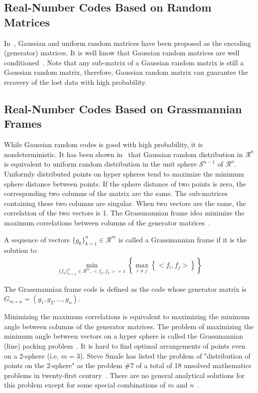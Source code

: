 \documentclass{sig-alternate}
\begin{document}
\subsection{Real-Number Codes Based on Random Matrices}

In~\cite{zchen:random_codes_utk, zchen:random_codes, zchen:random_condition},  
Gaussian and uniform random matrices have been proposed as the encoding (generator) matrices.
It is well know that Gaussian random matrices are well conditioned~\cite{edelman88:randm}.
Note that any sub-matrix of a Gaussian random matrix is still a Gaussian random matrix,
therefore, Gaussian random matrix can guarantee the recovery of the lost data with high probability.

 
\subsection{Real-Number Codes Based on Grassmannian Frames}

While Gaussian random codes is good with high probability, it is nondeterministic.
It has been shown in~\cite{knuth:random} that Gaussian random distribution 
in $\mathcal{R}^n$ is equivalent to uniform random distribution in the unit sphere
$\mathcal{S}^{n-1}$ of $\mathcal{R}^n$.
Uniformly distributed points on hyper spheres tend to maximize 
the minimum sphere distance between points.
If the sphere distance of two points is zero, 
the corresponding two columns of the matrix are the same. 
The sub-matrices containing these two columns are singular.
When two vectors are the same, the correlation of the two vectors
is 1. The Grassmannian frame idea minimize the maximum correlations 
between columns of the generator matrices~\cite{goyal: erasure, strohmer03:grassmannian}.

A sequence of vectors $\{g_k\}_{k=1}^{n} \in \mathcal{R}^m$ 
is called a Grassmannian frame if it is the solution to
\begin{eqnarray} 
\displaystyle \min_{\{f_k\}_{k=1}^{n} \in \mathcal{R}^m, < f_k, f_k > = 1 }
\left\{ \displaystyle \max_{i \neq j} \left\{  < f_i, f_j > \right\}  \right\}
\end{eqnarray} 

The Grassmannian frame code is defined as the 
code whose generator matrix is $G_{m \times n} = (g_1, g_2, \ldots, g_n)$.

Minimizing the maximum correlations is equivalent to maximizing 
the minimum angle between columns of the generator matrices. 
The problem of maximizing the minimum angle between vectors on a hyper sphere
is called the Grassmannian (line) packing problem~\cite{conway:grassmannian}. 
It is hard to find optimal arrangements of points even on a 2-sphere (i.e. $m=3$).
Steve Smale has listed the problem of "distribution of points on the 2-sphere" 
as the problem $\#7$ of a total of 18 unsolved mathematics 
problems in twenty-first century~\cite{smale:unsolved}.
There are no general analytical solutions for this 
problem except for some special combinations of 
$m$ and $n$~\cite{grass}.
\end{document}
